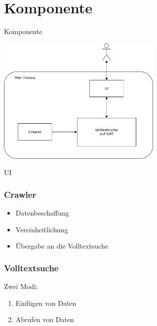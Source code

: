 \documentclass{beamer}
\begin{document}
\section{Komponente}
\begin{frame}
  \begin{center}
    {\Huge Komponente}
  \end{center}
\end{frame}

\begin{frame}
  \begin{center}
    \includegraphics[width=8cm]{Komponente-einzeln}
  \end{center}
\end{frame}

\begin{frame}
  \begin{center}
    {\Huge UI}
  \end{center}
\end{frame}

\begin{frame}
  \frametitle{Crawler}

  \begin{itemize}
    \item Datenbeschaffung
    \item Vereinheitlichung
    \item Übergabe an die Volltextsuche
  \end{itemize}
\end{frame}

\begin{frame}
  \frametitle{Volltextsuche}

  Zwei Modi:
  \begin{enumerate}
    \item Einfügen von Daten
    \item Abrufen von Daten
  \end{enumerate}
\end{frame}
\end{document}
